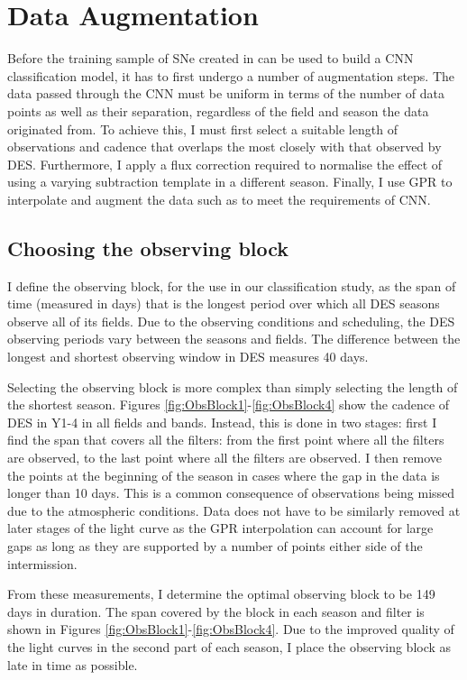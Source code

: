 \section{Data Augmentation} \label{sec:DataAugmentation}
Before the training sample of SNe created in  can be used to build a CNN classification model, it has to first undergo a number of augmentation steps. The data passed through the CNN must be uniform in terms of the number of data points as well as their separation, regardless of the field and season the data originated from. To achieve this, I must first select a suitable length of observations and cadence that overlaps the most closely with that observed by DES. Furthermore, I apply a flux correction required to normalise the effect of using a varying subtraction template in a different season. Finally, I use GPR to interpolate and augment the data such as to meet the requirements of CNN.

\subsection{Choosing the observing block} \label{sec:ObsBlock}
I define the observing block, for the use in our classification study, as the span of time (measured in days) that is the longest period over which all DES seasons observe all of its fields. Due to the observing conditions and scheduling, the DES observing periods vary between the seasons and fields. The difference between the longest and shortest observing window in DES measures 40 days.

Selecting the observing block is more complex than simply selecting the length of the shortest season. Figures \ref{fig:ObsBlock1}-\ref{fig:ObsBlock4} show the cadence of DES in Y1-4 in all fields and bands. Instead, this is done in two stages: first I find the span that covers all the filters: from the first point where all the filters are observed, to the last point where all the filters are observed. I then remove the points at the beginning of the season in cases where the gap in the data is longer than 10 days. This is a common consequence of observations being missed due to the atmospheric conditions. Data does not have to be similarly removed at later stages of the light curve as the GPR interpolation can account for large gaps as long as they are supported by a number of points either side of the intermission.

From these measurements, I determine the optimal observing block to be 149 days in duration. The span covered by the block in each season and filter is shown in Figures \ref{fig:ObsBlock1}-\ref{fig:ObsBlock4}. Due to the improved quality of the light curves in the second part of each season, I place the observing block as late in time as possible.

